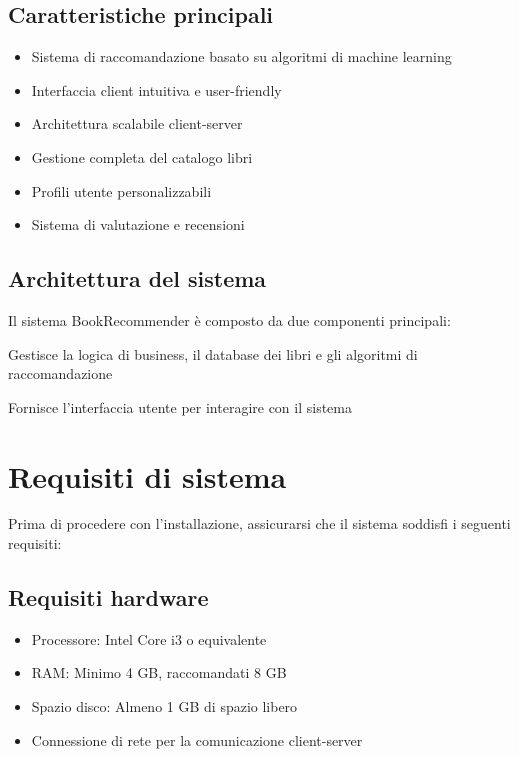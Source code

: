 \documentclass[12pt,a4paper]{article}
\begin{document}
\subsection{Caratteristiche principali}

\begin{itemize}
    \item Sistema di raccomandazione basato su algoritmi di machine learning
    \item Interfaccia client intuitiva e user-friendly
    \item Architettura scalabile client-server
    \item Gestione completa del catalogo libri
    \item Profili utente personalizzabili
    \item Sistema di valutazione e recensioni
\end{itemize}

\subsection{Architettura del sistema}

Il sistema BookRecommender è composto da due componenti principali:

\begin{description}[style=multiline, labelwidth=1.8cm, leftmargin=2.2cm]
    \item[Server] Gestisce la logica di business, il database dei libri e gli algoritmi di
    raccomandazione
    \item[Client] Fornisce l’interfaccia utente per interagire con il sistema
\end{description}

\section{Requisiti di sistema}

Prima di procedere con l'installazione, assicurarsi che il sistema soddisfi i seguenti requisiti:

\subsection{Requisiti hardware}
\begin{itemize}
    \item Processore: Intel Core i3 o equivalente
    \item RAM: Minimo 4 GB, raccomandati 8 GB
    \item Spazio disco: Almeno 1 GB di spazio libero
    \item Connessione di rete per la comunicazione client-server
\end{itemize}
\end{document}
